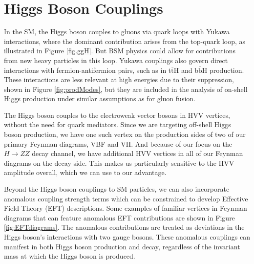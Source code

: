 
\section{Higgs Boson Couplings}

In the SM, the Higgs boson couples to gluons via quark loops with Yukawa interactions, where the dominant contribution arises from the top-quark loop, as illustrated in Figure \ref{fig.ggH}. But BSM physics could allow for contributions from new heavy particles in this loop. %
Yukawa couplings also govern direct interactions with fermion-antifermion pairs, such as in t$\bar{\text{t}}$H and b$\bar{\text{b}}$H production. These interactions are less relevant at high energies due to their suppression, shown in Figure \ref{fig:prodModes}, but they are included in the analysis of on-shell Higgs production under similar assumptions as for gluon fusion.

The Higgs boson couples to the electroweak vector bosons in HVV vertices, without the need for quark mediators. Since we are targeting off-shell Higgs boson production, we have one such vertex on the production sides of two of our primary Feynman diagrams, VBF and VH. And because of our focus on the \( H \to ZZ \) decay channel, we have additional HVV vertices in all of our Feynman diagrams on the decay side. This makes us particularly sensitive to the HVV amplitude overall, which we can use to our advantage.

Beyond the Higgs boson couplings to SM particles, we can also incorporate anomalous coupling strength terms which can be constrained to develop Effective Field Theory (EFT) descriptions. Some examples of familiar vertices in Feynman diagrams that can feature anomalous EFT contributions are shown in Figure \ref{fig:EFTdiagrams}. The anomalous contributions are treated as deviations in the Higgs boson's interactions with two gauge bosons. These anomalous couplings can manifest in both Higgs boson production and decay, regardless of the invariant mass at which the Higgs boson is produced. 

